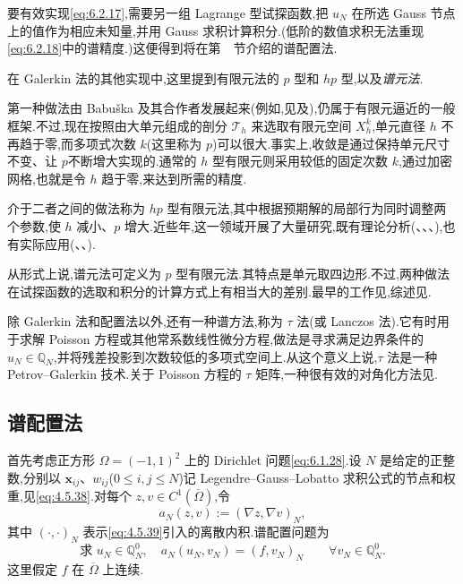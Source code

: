 要有效实现\eqref{eq:6.2.17},需要另一组 Lagrange 型试探函数,把 \(u_N\) 在所选 Gauss 节点上的值作为相应未知量,并用 Gauss 求积计算积分.(低阶的数值求积无法重现\eqref{eq:6.2.18}中的谱精度.)这便得到将在第~~节介绍的谱配置法.

在 Galerkin 法的其他实现中,这里提到有限元法的 \(p\) 型和 \(hp\) 型,以及\emph{谱元法}.

第一种做法由 Babuška 及其合作者发展起来(例如,见及),仍属于有限元逼近的一般框架.不过,现在按照由大单元组成的剖分 \(\mathcal T_h\) 来选取有限元空间 \(X_h^k\),单元直径 \(h\) 不再趋于零,而多项式次数 \(k\)(这里称为 \(p\))可以很大.事实上,收敛是通过保持单元尺寸不变、让 \(p\)不断增大实现的.通常的 \(h\) 型有限元则采用较低的固定次数 \(k\),通过加密网格,也就是令 \(h\) 趋于零,来达到所需的精度.

介于二者之间的做法称为 \(hp\) 型有限元法,其中根据预期解的局部行为同时调整两个参数,使 \(h\) 减小、\(p\) 增大.近些年,这一领域开展了大量研究,既有理论分析(、、、),也有实际应用(、、).

从形式上说,谱元法可定义为 \(p\) 型有限元法.其特点是单元取四边形.不过,两种做法在试探函数的选取和积分的计算方式上有相当大的差别.最早的工作见,综述见.

除 Galerkin 法和配置法以外,还有一种谱方法,称为 \(\tau\) 法(或 Lanczos 法).它有时用于求解 Poisson 方程或其他常系数线性微分方程,做法是寻求满足边界条件的 \(u_N\in\mathbb Q_N\),并将残差投影到次数较低的多项式空间上.从这个意义上说,\(\tau\) 法是一种 Petrov--Galerkin 技术.关于 Poisson 方程的 \(\tau\) 矩阵,一种很有效的对角化方法见.

\subsection{谱配置法}\label{sec:6.2.2}

首先考虑正方形 \(\Omega=(-1,1)^2\) 上的 Dirichlet 问题\eqref{eq:6.1.28}.设 \(N\) 是给定的正整数,分别以 \(\boldsymbol{x}_{ij}\)、\(w_{ij}\)(\(0\le i,j\le N\))记 Legendre--Gauss--Lobatto 求积公式的节点和权重,见\eqref{eq:4.5.38}.对每个 \(z,v\in C^1(\overline\Omega)\),令
\begin{equation}\label{eq:6.2.21}
  a_N(z,v):=(\nabla z,\nabla v)_N,
\end{equation}
其中 \((\cdot,\cdot)_N\) 表示\eqref{eq:4.5.39}引入的离散内积.谱配置问题为
\begin{equation}\label{eq:6.2.22}
  \text{求 }u_N\in\mathbb Q_N^0,\quad
    a_N(u_N,v_N)=(f,v_N)_N\qquad\forall v_N\in\mathbb Q_N^0.
\end{equation}
这里假定 \(f\) 在 \(\overline\Omega\) 上连续.

